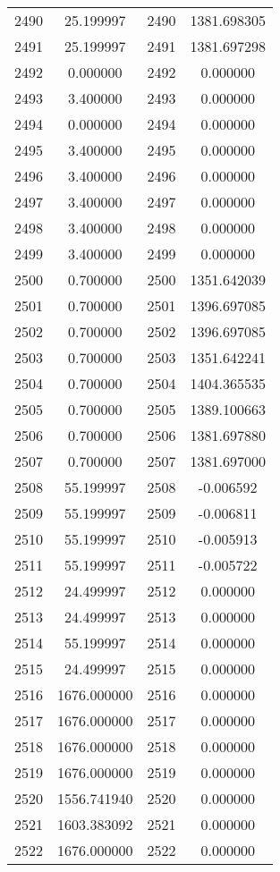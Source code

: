\documentclass[12pt]{article}
\begin{document}
\begin{longtable}{@{}cccc@{}}
2490 & 25.199997 & 2490 & 1381.698305 \\
2491 & 25.199997 & 2491 & 1381.697298 \\
2492 & 0.000000 & 2492 & 0.000000 \\
2493 & 3.400000 & 2493 & 0.000000 \\
2494 & 0.000000 & 2494 & 0.000000 \\
2495 & 3.400000 & 2495 & 0.000000 \\
2496 & 3.400000 & 2496 & 0.000000 \\
2497 & 3.400000 & 2497 & 0.000000 \\
2498 & 3.400000 & 2498 & 0.000000 \\
2499 & 3.400000 & 2499 & 0.000000 \\
2500 & 0.700000 & 2500 & 1351.642039 \\
2501 & 0.700000 & 2501 & 1396.697085 \\
2502 & 0.700000 & 2502 & 1396.697085 \\
2503 & 0.700000 & 2503 & 1351.642241 \\
2504 & 0.700000 & 2504 & 1404.365535 \\
2505 & 0.700000 & 2505 & 1389.100663 \\
2506 & 0.700000 & 2506 & 1381.697880 \\
2507 & 0.700000 & 2507 & 1381.697000 \\
2508 & 55.199997 & 2508 & -0.006592 \\
2509 & 55.199997 & 2509 & -0.006811 \\
2510 & 55.199997 & 2510 & -0.005913 \\
2511 & 55.199997 & 2511 & -0.005722 \\
2512 & 24.499997 & 2512 & 0.000000 \\
2513 & 24.499997 & 2513 & 0.000000 \\
2514 & 55.199997 & 2514 & 0.000000 \\
2515 & 24.499997 & 2515 & 0.000000 \\
2516 & 1676.000000 & 2516 & 0.000000 \\
2517 & 1676.000000 & 2517 & 0.000000 \\
2518 & 1676.000000 & 2518 & 0.000000 \\
2519 & 1676.000000 & 2519 & 0.000000 \\
2520 & 1556.741940 & 2520 & 0.000000 \\
2521 & 1603.383092 & 2521 & 0.000000 \\
2522 & 1676.000000 & 2522 & 0.000000 \\

\end{longtable}
\end{document}
